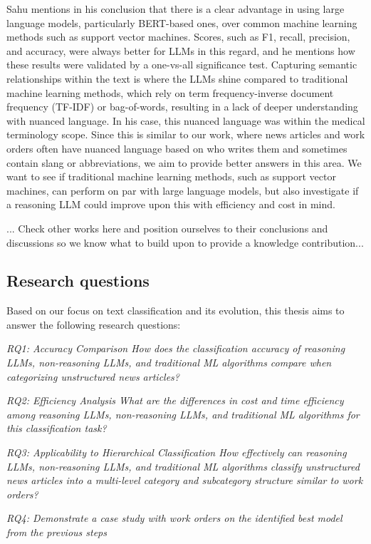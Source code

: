 


Sahu \cite{sahu2025language} mentions in his conclusion that there is a clear advantage in using large language models, particularly BERT-based ones, over common machine learning methods such as support vector machines. Scores, such as F1, recall, precision, and accuracy, were always better for LLMs in this regard, and he mentions how these results were validated by a one-vs-all significance test. Capturing semantic relationships within the text is where the LLMs shine compared to traditional machine learning methods, which rely on term frequency-inverse document frequency (TF-IDF) or bag-of-words, resulting in a lack of deeper understanding with nuanced language. In his case, this nuanced language was within the medical terminology scope. Since this is similar to our work, where news articles and work orders often have nuanced language based on who writes them and sometimes contain slang or abbreviations, we aim to provide better answers in this area. We want to see if traditional machine learning methods, such as support vector machines, can perform on par with large language models, but also investigate if a reasoning LLM could improve upon this with efficiency and cost in mind.

... Check other works here and position ourselves to their conclusions and discussions so we know what to build upon to provide a knowledge contribution...

\subsection{Research questions}

Based on our focus on text classification and its evolution, this thesis aims to answer the following research questions:

\bigskip
\textit{RQ1: Accuracy Comparison
\newline
How does the classification accuracy of reasoning LLMs, non-reasoning LLMs, and traditional ML algorithms compare when categorizing unstructured news articles?}

\bigskip
\textit{RQ2: Efficiency Analysis
\newline
What are the differences in cost and time efficiency among reasoning LLMs, non-reasoning LLMs, and traditional ML algorithms for this classification task?}

\bigskip
\textit{RQ3: Applicability to Hierarchical Classification
\newline
How effectively can reasoning LLMs, non-reasoning LLMs, and traditional ML algorithms classify unstructured news articles into a multi-level category and subcategory structure similar to work orders?}

\bigskip
\textit{RQ4: Demonstrate a case study with work orders on the identified best model from the previous steps} %